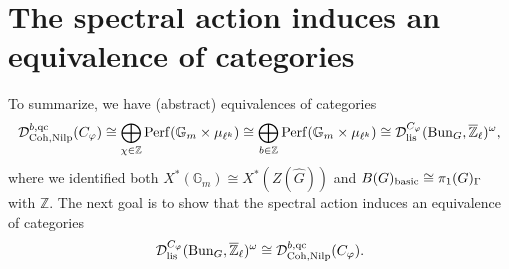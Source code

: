 \section{The spectral action induces an equivalence of categories}
To summarize, we have (abstract) equivalences of categories
$$\mathcal{D}^{b, \operatorname{\operatorname{qc}}}_{\operatorname{\operatorname{Coh}}, \operatorname{\operatorname{Nilp}}}(C_{\varphi}) \cong \bigoplus_{\chi \in \mathbb{Z}}\operatorname{\operatorname{Perf}}(\mathbb{G}_m \times \mu_{\ell^k}) \cong \bigoplus_{b \in \mathbb{Z}}\operatorname{\operatorname{Perf}}(\mathbb{G}_m \times \mu_{\ell^k}) \cong \mathcal{D}^{C_{\varphi}}_{\operatorname{\operatorname{lis}}}(\operatorname{\operatorname{Bun}}_G, \overline{\mathbb{Z}}_{\ell})^{\omega},$$
where we identified both $X^*(\mathbb{G}_m) \cong X^*(Z(\hat{G}))$ and $B(G)_{\operatorname{\operatorname{basic}}} \cong \pi_1(G)_{\Gamma}$ with $\mathbb{Z}$. The next goal is to show that the spectral action induces an equivalence of categories
\begin{equation}\label{Equiv}
	\mathcal{D}_{\operatorname{\operatorname{lis}}}^{C_{\varphi}}(\operatorname{\operatorname{Bun}}_G, \overline{\mathbb{Z}}_{\ell})^{\omega} \cong \mathcal{D}^{b, \operatorname{\operatorname{qc}}}_{\operatorname{\operatorname{Coh}}, \operatorname{\operatorname{Nilp}}}(C_{\varphi}).
\end{equation}

%

%
%
%

